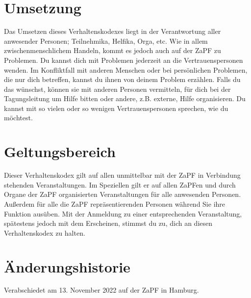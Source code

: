 \documentclass[12pt,oneside]{scrartcl}
\begin{document}
\section{Umsetzung%
  \label{umsetzung}%
}

Das Umsetzen dieses Verhaltenskodexes liegt in der Verantwortung aller
anwesender Personen; Teilnehmika, Helfika, Orga, etc. Wie in allem
zwischenmenschlichem Handeln, kommt es jedoch auch auf der ZaPF zu Problemen. Du
kannst dich mit Problemen jederzeit an die Vertrauenspersonen wenden. Im
Konfliktfall mit anderen Menschen oder bei persönlichen Problemen, die nur dich
betreffen, kannst du ihnen von deinem Problem erzählen. Falls du das wünschst,
können sie mit anderen Personen vermitteln, für dich bei der Tagungsleitung um
Hilfe bitten oder andere, z.B. externe, Hilfe organisieren. Du kannst mit so
vielen oder so wenigen Vertrauenspersonen sprechen, wie du möchtest.


\section{Geltungsbereich%
  \label{geltungsbereich}%
}

Dieser Verhaltenskodex gilt auf allen unmittelbar mit der ZaPF in Verbindung
stehenden Veranstaltungen. Im Speziellen gilt er auf allen ZaPFen und durch
Organe der ZaPF organisierten Veranstaltungen für alle anwesenden
Personen. Außerdem für alle die ZaPF repräsentierenden Personen während Sie ihre
Funktion ausüben. Mit der Anmeldung zu einer entsprechenden Veranstaltung,
spätestens jedoch mit dem Erscheinen, stimmst du zu, dich an diesen
Verhaltenskodex zu halten.


\section{Änderungshistorie%
  \label{anderungshistorie}%
}

Verabschiedet am 13. November 2022 auf der ZaPF in Hamburg.
\end{document}
